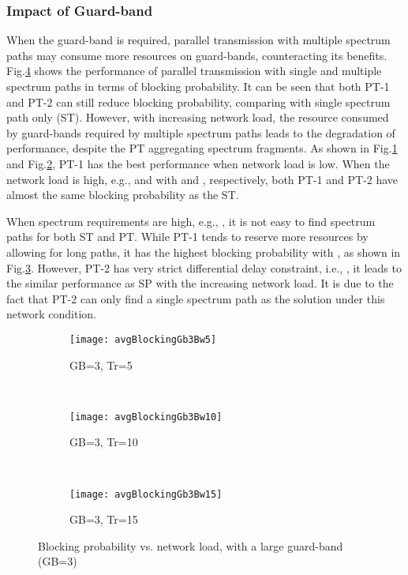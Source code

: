 \documentclass[conference]{IEEEtran}
\begin{document}
\subsubsection{Impact of Guard-band}
When the guard-band is required, parallel transmission with multiple spectrum paths 
may consume more resources on guard-bands, counteracting its benefits. Fig.\ref{fig:gb3} shows the performance of 
parallel transmission with single and multiple spectrum paths in terms of blocking probability.  It can be seen that both 
PT-1 and PT-2 can still reduce blocking probability, comparing with single spectrum path only (ST). However, with 
increasing network load, the resource consumed by guard-bands required by multiple spectrum paths  leads to the 
degradation of performance, despite the PT aggregating spectrum fragments. As shown in Fig.\ref{fig:gb3-1} and 
Fig.\ref{fig:gb3-2}, PT-1 has the best performance when network load is low. When the network load is high, e.g., 
 and  with  and , respectively, both PT-1 and PT-2 have almost the same 
blocking probability as the ST. 

When spectrum requirements are high, e.g., , it is not easy to find spectrum paths for both ST and PT. 
While PT-1 tends to reserve more resources by allowing for long paths, it has the highest blocking probability with  , as shown in Fig.\ref{fig:gb3-3}. However, PT-2  has very strict differential delay constraint, i.e., , it leads to the similar performance as SP with the increasing network load.  It is due to the fact that PT-2 can only find a single spectrum  path as the solution under this network condition. 
 \begin{figure}
        \centering
        \begin{subfigure}[b]{0.47\textwidth}
                \centering
                \texttt{[image: avgBlockingGb3Bw5]}
                \caption{ GB=3, Tr=5 }
                \label{fig:gb3-1}
        \end{subfigure}  \\
\begin{subfigure}[b]{0.47\textwidth}
                \centering
                \texttt{[image: avgBlockingGb3Bw10]}
                \caption{ GB=3, Tr=10}
                \label{fig:gb3-2}
        \end{subfigure}  \\
\begin{subfigure}[b]{0.47\textwidth}
                \centering
                \texttt{[image: avgBlockingGb3Bw15]}
                \caption{GB=3, Tr=15}
                \label{fig:gb3-3}
        \end{subfigure}
        \caption{Blocking probability vs. network load, with a large guard-band (GB=3)}\label{fig:gb3}
\end{figure} 
\end{document}
